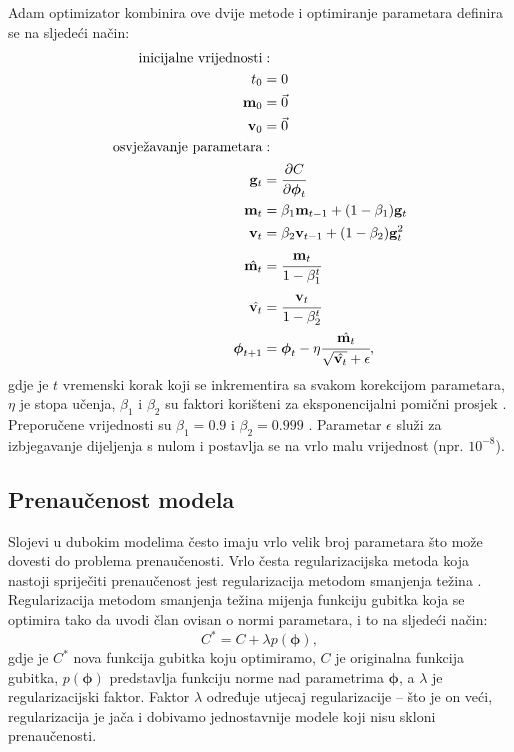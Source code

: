 \documentclass[times, utf8, diplomski, numeric]{fer}
\begin{document}
Adam optimizator kombinira ove dvije metode i optimiranje parametara definira se na sljedeći način:
\begin{align}
 \text{inicijalne vrijednosti}&: \nonumber \\
 t_0 &= 0 \nonumber \\
 \mathbf{m}_0 &= \vec{0} \nonumber \\
 \mathbf{v}_0 &= \vec{0} \nonumber  \\
 \text{osvježavanje parametara}&: \nonumber \\
 \mathbf{g}_t &= \cfrac{\partial C}{\partial \boldsymbol{\phi}_t}  \nonumber \\
 \mathbf{m}_t &= \beta_1 \mathbf{m}_{t-1} + (1 - \beta_1) \mathbf{g}_t \nonumber \\
 \mathbf{v}_t &= \beta_2 \mathbf{v}_{t-1} + (1 - \beta_2) \mathbf{g}_t^2 \nonumber \\
 \hat{\mathbf{m}_t} &= \cfrac{\mathbf{m}_t}{1 - \beta_1^t} \nonumber \\
 \hat{\mathbf{v}_t} &= \cfrac{\mathbf{v}_t}{1 - \beta_2^t} \nonumber \\
 \boldsymbol{\phi}_{t+1} &= \boldsymbol{\phi}_t - \eta \cfrac{\hat{\mathbf{m}_t}}{\sqrt{\hat{\mathbf{v}_t}} + \epsilon} \nonumber,
\end{align}
gdje je $t$ vremenski korak koji se inkrementira sa svakom korekcijom parametara, $\eta$ je stopa učenja, $\beta_1$ i $\beta_2$ su faktori korišteni za
eksponencijalni pomični prosjek . Preporučene vrijednosti su $\beta_1=0.9$ i $\beta_2=0.999$ \citep{article:adam}.
Parametar $\epsilon$ služi za izbjegavanje dijeljenja s nulom i postavlja se na vrlo malu vrijednost (npr. $10^{-8}$).


\subsection{Prenaučenost modela}

Slojevi u dubokim modelima često imaju vrlo velik broj parametara što može dovesti do problema prenaučenosti.
Vrlo česta regularizacijska metoda koja nastoji spriječiti prenaučenost jest regularizacija metodom smanjenja težina .
Regularizacija metodom smanjenja težina mijenja funkciju gubitka koja se optimira tako da uvodi član ovisan o normi parametara, i to na sljedeći način:
\begin{equation}
 C^* = C + \lambda p(\boldsymbol{\phi}),
\end{equation}
gdje je $C^*$ nova funkcija gubitka koju optimiramo, $C$ je originalna funkcija gubitka, $p(\boldsymbol{\phi})$ predstavlja funkciju norme nad parametrima $\boldsymbol{\phi}$, a $\lambda$ je regularizacijski faktor.
Faktor $\lambda$ određuje utjecaj regularizacije -- što je on veći, regularizacija je jača i dobivamo jednostavnije modele koji nisu skloni prenaučenosti.
\end{document}
